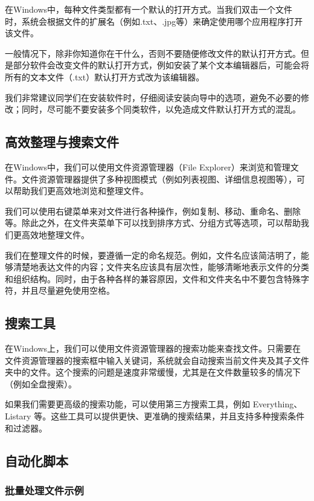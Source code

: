 \documentclass[../main.tex]{subfiles}
\begin{document}
在Windows中，每种文件类型都有一个默认的打开方式。当我们双击一个文件时，系统会根据文件的扩展名（例如.txt、.jpg等）来确定使用哪个应用程序打开该文件。

一般情况下，除非你知道你在干什么，否则不要随便修改文件的默认打开方式。但是部分软件会改变文件的默认打开方式，例如安装了某个文本编辑器后，可能会将所有的文本文件（.txt）默认打开方式改为该编辑器。

我们非常建议同学们在安装软件时，仔细阅读安装向导中的选项，避免不必要的修改；同时，尽可能不要安装多个同类软件，以免造成文件默认打开方式的混乱。

\subsection{高效整理与搜索文件}

在Windows中，我们可以使用文件资源管理器（File Explorer）来浏览和管理文件。文件资源管理器提供了多种视图模式（例如列表视图、详细信息视图等），可以帮助我们更高效地浏览和整理文件。

我们可以使用右键菜单来对文件进行各种操作，例如复制、移动、重命名、删除等。除此之外，在文件夹菜单下可以找到排序方式、分组方式等选项，可以帮助我们更高效地整理文件。

我们在整理文件的时候，要遵循一定的命名规范。例如，文件名应该简洁明了，能够清楚地表达文件的内容；文件夹名应该具有层次性，能够清晰地表示文件的分类和组织结构。同时，由于各种各样的兼容原因，文件和文件夹名中不要包含特殊字符，并且尽量避免使用空格。

\subsection{搜索工具}

在Windows上，我们可以使用文件资源管理器的搜索功能来查找文件。只需要在文件资源管理器的搜索框中输入关键词，系统就会自动搜索当前文件夹及其子文件夹中的文件。这个搜索的问题是速度非常缓慢，尤其是在文件数量较多的情况下（例如全盘搜索）。

如果我们需要更高级的搜索功能，可以使用第三方搜索工具，例如 Everything、Listary 等。这些工具可以提供更快、更准确的搜索结果，并且支持多种搜索条件和过滤器。

\subsection{自动化脚本}

\subsubsection{批量处理文件示例}
\end{document}
